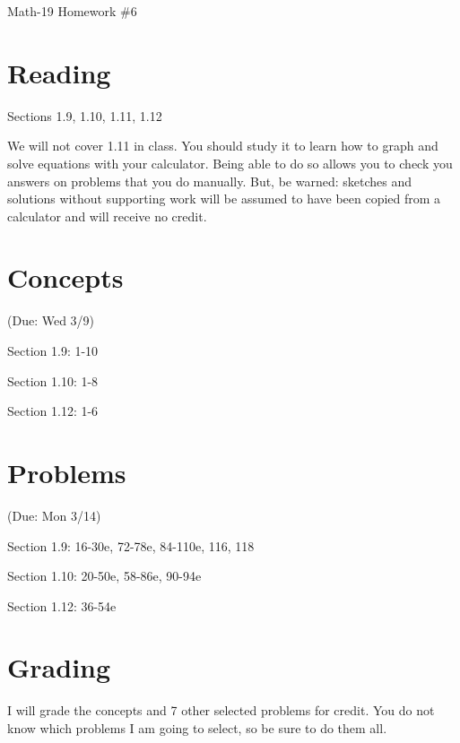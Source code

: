 \documentclass[letterpaper,12pt,fleqn]{article}
\begin{document}
\begin{center}
\Large Math-19 Homework \#6
\end{center}

\section*{Reading}

Sections 1.9, 1.10, 1.11, 1.12

We will not cover 1.11 in class. You should study it to learn how to graph and
solve equations with your calculator.  Being able to do so allows you to check
you answers on problems that you do manually.  But, be warned: sketches and
solutions without supporting work will be assumed to have been copied from a
calculator and will receive no credit.

\section*{Concepts}

(Due: Wed 3/9)

Section 1.9: 1-10

Section 1.10: 1-8

Section 1.12: 1-6

\section*{Problems}

(Due: Mon 3/14)

Section 1.9: 16-30e, 72-78e, 84-110e, 116, 118

Section 1.10: 20-50e, 58-86e, 90-94e

Section 1.12: 36-54e

\section*{Grading}

I will grade the concepts and 7 other selected problems for credit. You do not
know which problems I am going to select, so be sure to do them all.
\end{document}
